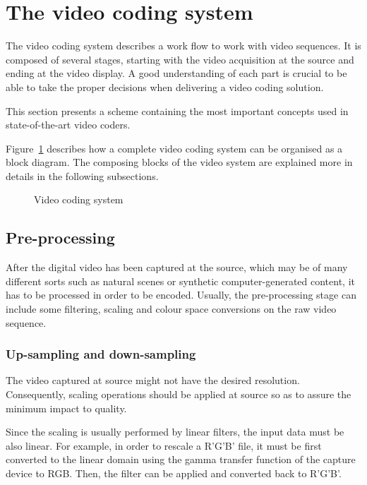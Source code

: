 \documentclass[11pt,a4paper,openright,twoside]{book}
\numberwithin{equation}{section} %
\numberwithin{figure}{section} %
\numberwithin{table}{section} %
\begin{document}
\section{The video coding system}
\label{sec:the_video_coding_system}

The video coding system describes a work flow to work with video
sequences.
It is composed of several stages, starting with the video acquisition at
the source and ending at the video display.
A good understanding of each part is crucial to be able to take the
proper decisions when delivering a video coding solution.

This section presents a scheme containing the most important concepts
used in state-of-the-art video coders.

Figure~\ref{fig:video_coding_system} describes how a complete video coding
system can be organised as a block diagram.
The composing blocks of the video system are explained more in details in the
following subsections.

\begin{figure}[tb]
	\centering
	
	\caption{Video coding system}
	\label{fig:video_coding_system}
\end{figure}

\subsection{Pre-processing}
\label{sub:pre_processing}

After the digital video has been captured at the source, which may be of many
different sorts such as natural scenes or synthetic computer-generated
content, it has to be processed in order to be encoded.
Usually, the pre-processing stage can include some filtering, scaling and
colour space conversions on the raw video sequence.

\subsubsection{Up-sampling and down-sampling}
\label{ssub:up-sampling_and_down-sampling}

The video captured at source might not have the desired resolution.
Consequently, scaling operations should be applied at source so as to assure
the minimum impact to quality.

Since the scaling is usually performed by linear filters, the input data must
be also linear.
For example, in order to rescale a R'G'B' file, it must be first converted to
the linear domain using the gamma transfer function of the capture device to
RGB.
Then, the filter can be applied and converted back to R'G'B'.
\end{document}

